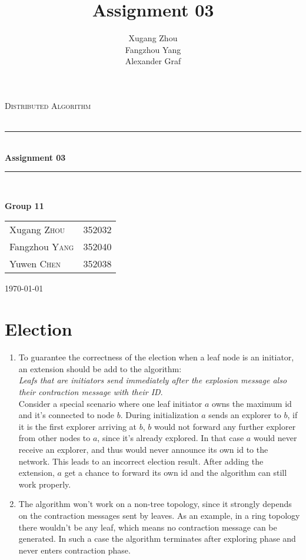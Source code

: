\documentclass[a4paper, 14pt]{article}
\title{\bf Assignment 03}
\author{Xugang Zhou \\ Fangzhou Yang \\ Alexander Graf}
\newcommand{\HRule}{\rule{\linewidth}{0.5mm}}
\begin{document}
\begin{titlepage}
\begin{center}
\vfill
\textsc{\LARGE Distributed Algorithm}\\[1.5cm]
\textsc{\Large }\\[0.5cm]

\HRule \\[0.4cm]
{\huge \bfseries Assignment 03}\\[0.4cm]
\HRule \\[1.5cm]
\begin{minipage}{0.4\textwidth}
\begin{flushleft} \large
\large{\textbf{Group 11}}
\end{flushleft}
\end{minipage}
\begin{minipage}{0.4\textwidth}
\begin{flushright} \large
\begin{tabular}{ll}
Xugang \textsc{Zhou} & 352032\\
Fangzhou \textsc{Yang} & 352040\\
Yuwen \textsc{Chen} & 352038
\end{tabular}
\end{flushright}
\end{minipage}
\vfill
{\large \today}\\
\end{center}
\end{titlepage}
\thispagestyle{fancy}

\section{Election}
\begin{enumerate}
\item To guarantee the correctness of the election when a leaf node is an initiator, an extension should be add to the algorithm:\\
 \emph{Leafs that are initiators send immediately after the explosion message also their contraction message with their ID}. \\
Consider a special scenario where one leaf initiator $a$ owns the maximum id and it's connected to node $b$. During initialization $a$ sends an explorer to $b$, if it is the first explorer arriving at $b$, $b$ would not forward any further explorer from other nodes to $a$, since it's already explored. In that case $a$ would never receive an explorer, and thus would never announce its own id to the network. This leads to an incorrect election result. After adding the extension, $a$ get a chance to forward its own id and the algorithm can still work properly.

\item The algorithm won't work on a non-tree topology, since it strongly depends on the contraction messages sent by leaves. As an example, in a ring topology there wouldn't be any leaf, which means no contraction message can be generated. In such a case the algorithm terminates after exploring phase and never enters contraction phase.

\end{enumerate}
\end{document}
